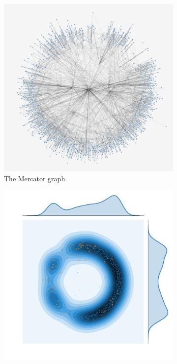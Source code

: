 \begin{figure}[H]
     \centering
      \begin{subfigure}[b]{.495\textwidth}
         \centering
     \includegraphics[width=\textwidth,angle=90]{figures_c1/layout/merc1.png}
         \caption{The Mercator graph.}
     \end{subfigure}
    \begin{subfigure}[b]{.495\textwidth}
         \centering
     \includegraphics[width=\textwidth]{figures_c1/layout/merc_aphh.pdf}

\end{subfigure}
\end{figure}
